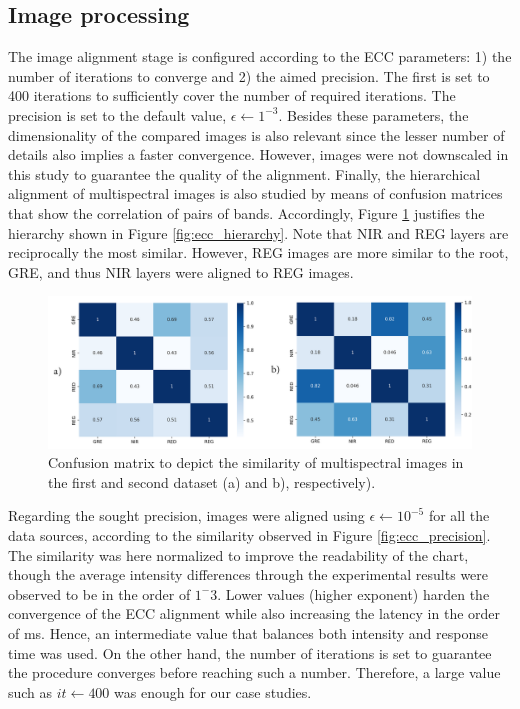 \subsection{Image processing}

The image alignment stage is configured according to the ECC parameters: 1) the number of iterations to converge and 2) the aimed precision. The first is set to 400 iterations to sufficiently cover the number of required iterations. The precision is set to the default value, $\epsilon \gets 1^{-3}$. Besides these parameters, the dimensionality of the compared images is also relevant since the lesser number of details also implies a faster convergence. However, images were not downscaled in this study to guarantee the quality of the alignment. Finally, the hierarchical alignment of multispectral images is also studied by means of confusion matrices that show the correlation of pairs of bands. Accordingly, Figure \ref{fig:occlusion_confusion_matrices} justifies the hierarchy shown in Figure \ref{fig:ecc_hierarchy}. Note that NIR and REG layers are reciprocally the most similar. However, REG images are more similar to the root, GRE, and thus NIR layers were aligned to REG images.

\begin{figure}[ht]
    \centering
    \includegraphics[width=.9\linewidth]{figs/multi_thermal_projection/results/confusion_matrices.png}
    \caption{Confusion matrix to depict the similarity of multispectral images in the first and second dataset (a) and b), respectively).}
    \label{fig:occlusion_confusion_matrices}
\end{figure}

Regarding the sought precision, images were aligned using $\epsilon \gets 10^{-5}$ for all the data sources, according to the similarity observed in Figure \ref{fig:ecc_precision}. The similarity was here normalized to improve the readability of the chart, though the average intensity differences through the experimental results were observed to be in the order of $1^-3$. Lower values (higher exponent) harden the convergence of the ECC alignment while also increasing the latency in the order of \si{\milli\second}. Hence, an intermediate value that balances both intensity and response time was used. On the other hand, the number of iterations is set to guarantee the procedure converges before reaching such a number. Therefore, a large value such as $\textit{it} \gets 400$ was enough for our case studies.

